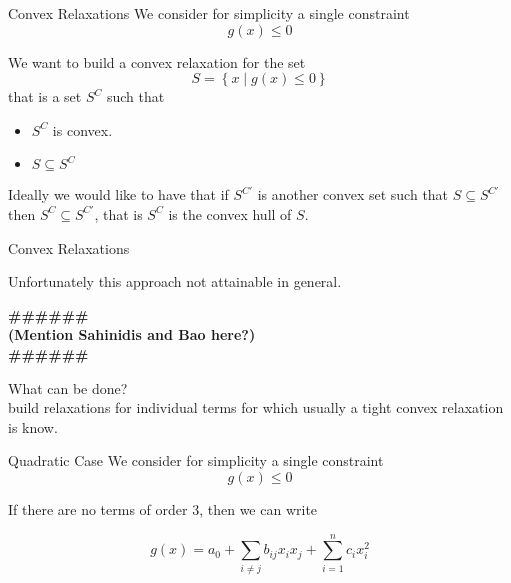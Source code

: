 \documentclass{beamer}
\newcommand{\todo}[1]
{\begin{tiny}
  \begin{center} {\color{red}
  \textbf{ {\#\#\#\hfill\#\#\#}\\{#1}\\\#\#\#\hfill\#\#\#}}
\end{center}
\end{tiny}} %
\begin{document}



\begin{frame}{Convex Relaxations}
  We consider for simplicity a single constraint
  \begin{displaymath}
    g(x) \leq 0
  \end{displaymath}

  We want to build a convex relaxation for the set
  \begin{displaymath}
    S = \left\{ x \mid g(x) \leq 0 \right\}
  \end{displaymath}
  that is a set $S^C$ such that
  \begin{itemize}
    \item
      $S^C$ is convex.
    \item
      $S \subseteq S^C $
  \end{itemize}
  Ideally we would like to have that if $S^{C'}$ is another convex set such that
  $S \subseteq S^{C'}$ then $S^{C} \subseteq S^{C'}$, that is $S^C$ is the convex hull of
  $S$.
\end{frame}

\begin{frame}{Convex Relaxations}

  Unfortunately this approach not attainable in general.
  \todo{  (Mention Sahinidis and Bao here?) }

  What can be done? \\

  build relaxations for individual terms for which usually a tight convex relaxation is
  know.

\end{frame}

\begin{frame}{Quadratic Case}
  We consider for simplicity a single constraint
  \begin{displaymath}
    g(x) \leq 0
  \end{displaymath}

  If there are no terms of order 3, then we can write

  \begin{displaymath}
    g(x) = a_0 + \sum_{i \neq j} b_{ij} x_i x_j + \sum_{i=1}^n c_i x_i^2
  \end{displaymath}
\end{frame}
\end{document}
